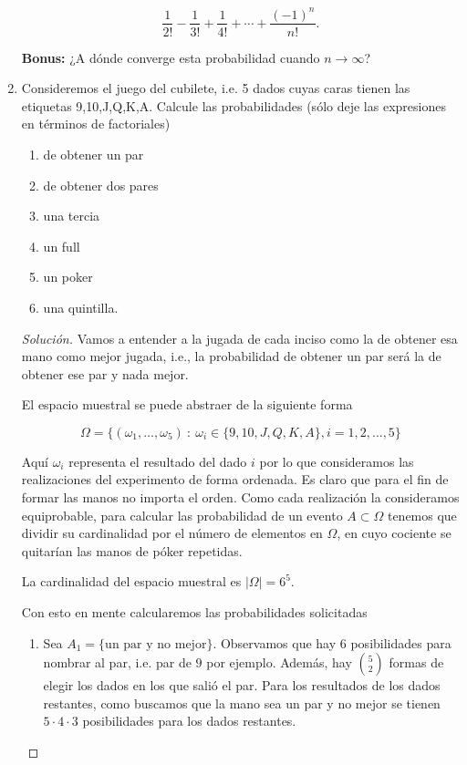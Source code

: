 \documentclass{article}
\begin{document}
\begin{enumerate}
    \[ \frac{1}{2!} - \frac{1}{3!} + \frac1{4!} + \cdots + \frac{(-1)^n}{n!}. \]

    \textbf{Bonus:} ¿A dónde converge esta probabilidad cuando $n\to\infty$?

    \item Consideremos el juego del cubilete, i.e. 5 dados cuyas caras tienen las etiquetas 9,10,J,Q,K,A. Calcule las probabilidades (sólo deje las expresiones en términos de factoriales)
    \begin{enumerate}
        \item de obtener un par
        \item de obtener dos pares
        \item una tercia
        \item un full
        \item un poker
        \item una quintilla.
    \end{enumerate}


    \begin{proof}[Solución]
        Vamos a entender a la jugada de cada inciso como la de obtener esa mano como mejor jugada, i.e., la probabilidad de obtener un par será la de obtener ese par y nada mejor. 

El espacio muestral se puede abstraer de la siguiente forma

\begin{equation*}
    \Omega=\{(\omega_1,\dots,\omega_5)\ :\ \omega_i\in\{9,10,J,Q,K,A\},i=1,2,\dots,5\}
\end{equation*}

Aquí $\omega_i$ representa el resultado del dado $i$ por lo que consideramos las realizaciones del experimento de forma ordenada. Es claro que para el fin de formar las manos no importa el orden. Como cada realización la consideramos equiprobable, para calcular las probabilidad de un evento $A\subset \Omega$ tenemos que dividir su cardinalidad por el número de elementos en $\Omega$, en cuyo cociente se quitarían las manos de póker repetidas.

La cardinalidad del espacio muestral es $|\Omega|=6^5$.

Con esto en mente calcularemos las probabilidades solicitadas

\begin{enumerate}
    \item Sea $A_1=\{\text{un par y no mejor}\}$. Observamos que hay $6$ posibilidades para nombrar al par, i.e. par de $9$ por ejemplo. Además, hay $\binom{5}{2}$ formas de elegir los dados en los que salió el par. Para los resultados de los dados restantes, como buscamos que la mano sea un par y no mejor se tienen $5\cdot 4\cdot 3$ posibilidades para los dados restantes. 
    

\end{enumerate}
\end{proof}
\end{enumerate}
\end{document}
